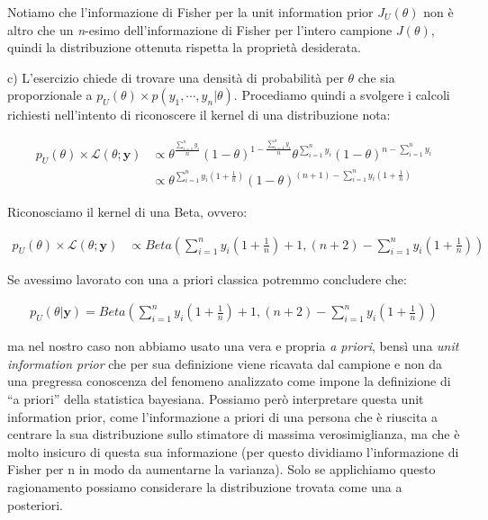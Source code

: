 Notiamo che l'informazione di Fisher per la unit information prior $J_U(\theta)$ non è 
altro che un \textit{n}-esimo dell'informazione di Fisher per l'intero 
campione $J(\theta)$, quindi la distribuzione ottenuta rispetta la proprietà 
desiderata.

\bigskip
c)  L'esercizio chiede di trovare una densità di probabilità per $\theta$ che sia proporzionale a $p_U(\theta) \times p(y_1,\cdots,y_n|\theta)$. Procediamo quindi a svolgere i calcoli richiesti nell'intento di riconoscere il kernel di una distribuzione nota:

\begin{align*}
p_U(\theta) \times \mathcal{L}(\theta;\textbf{y}) &\propto
\theta^\frac{\sum_{i=1}^n y_i}{n} 
(1-\theta)^{1-\frac{\sum_{i=1}^n y_i}{n}} 
\theta^ {\sum_{i=1}^n y_i}
(1-\theta)^{n-\sum_{i=1}^n y_i}\\
&\propto \theta^{\sum_{i=1}^n y_i(1+\frac{1}{n}) }
(1-\theta)^{(n+1) - \sum_{i=1}^n y_i (1+\frac{1}{n}) }
\end{align*}

Riconosciamo il kernel di una Beta, ovvero:


\begin{align*}
p_U(\theta) \times \mathcal{L}(\theta;\textbf{y}) &\propto 
Beta
\left( 
\sum_{i=1}^n y_i\left(1+\frac{1}{n}\right)  + 1, 
(n+2) - \sum_{i=1}^n y_i \left(1+\frac{1}{n}\right) 
\right)
\end{align*}

Se avessimo lavorato con una a priori classica potremmo  concludere che:

\begin{align*}
p_U(\theta|\textbf{y}) =
Beta
\left( 
\sum_{i=1}^n y_i\left(1+\frac{1}{n}\right)  + 1, 
(n+2) - \sum_{i=1}^n y_i \left(1+\frac{1}{n}\right) 
\right)
\end{align*}

ma nel nostro caso non abbiamo usato una vera e propria \textit{a priori}, 
bensì una \textit{unit information prior} che per sua definizione viene ricavata 
dal campione e non da una pregressa conoscenza del fenomeno analizzato come impone 
la definizione di ``a priori'' della statistica bayesiana. 
Possiamo però interpretare questa unit information prior, come l’informazione a 
priori di una persona che è riuscita a centrare la sua distribuzione sullo stimatore 
di massima verosimiglianza, ma che è molto insicuro di questa sua informazione 
(per questo dividiamo l’informazione di Fisher per n in modo da aumentarne la varianza). 
Solo se applichiamo questo ragionamento possiamo considerare la distribuzione trovata 
come una a posteriori.

